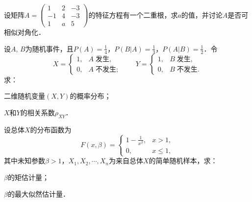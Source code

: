 \documentclass[plain,noanswer,medmath]{../../template/jnuexam}
\begin{document}
\begin{problem}[points=9]
设矩阵$A = \begin{pmatrix}
   1 & 2 & -3 \\
  -1 & 4 & -3 \\
   1 & a & 5
\end{pmatrix}$的特征方程有一个二重根，求$a$的值，并讨论$A$是否可相似对角化．
\end{problem}


\begin{problem}[points=9]
设$A$, $B$为随机事件，且$P(A) = \frac{1}{4}$，$P(B|A) = \frac{1}{3}$，$P(A|B) = \frac{1}{2}$．令
$$X = \begin{cases}
  1, & A\;\text{发生}, \\
  0, & A\;\text{不发生};
\end{cases}\qquad Y = \begin{cases}
  1, & B\;\text{发生}, \\
  0, & B\;\text{不发生}.
\end{cases}$$
求：
\begin{enumerate*}
\item 二维随机变量$(X,Y)$的概率分布；
\item $X$和$Y$的相关系数$\rho_{XY}$．
\end{enumerate*}
\end{problem}


\begin{problem}[points=9]
设总体$X$的分布函数为
$$F(x,\beta) = \begin{cases}
  1 - \frac{1}{x^{\beta}}, & x > 1, \\
                        0, & x \le 1,
\end{cases}$$
其中未知参数$\beta > 1$，$X_1,X_2, \cdots ,X_n$为来自总体$X$的简单随机样本，求：\par
\begin{enumerate*}
\item $\beta$的矩估计量；
\item $\beta$的最大似然估计量．
\end{enumerate*}
\end{problem}
\end{document}

